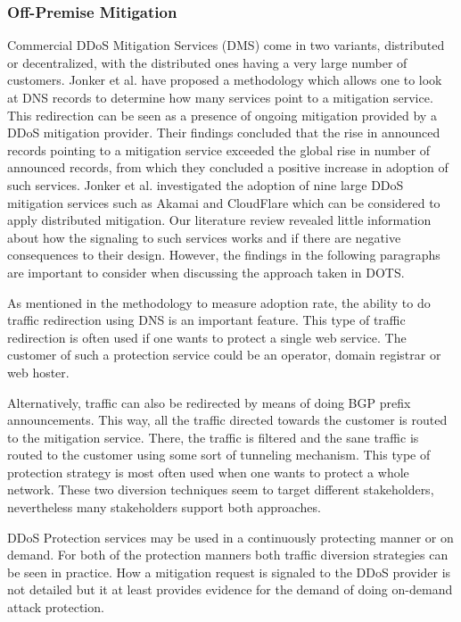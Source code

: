 \subsubsection{Off-Premise Mitigation}
Commercial DDoS Mitigation Services (DMS) come in two variants, distributed or decentralized, with the distributed ones having a very large number of customers. Jonker et al. have proposed a methodology which allows one to look at DNS records to determine how many services point to a mitigation service. This redirection can be seen as a presence of ongoing mitigation provided by a DDoS mitigation provider. Their findings concluded that the rise in announced records pointing to a mitigation service exceeded the global rise in number of announced records, from which they concluded a positive increase in adoption of such services.
Jonker et al. investigated the adoption of nine large DDoS mitigation services such as Akamai and CloudFlare which can be considered to apply distributed mitigation. Our literature review revealed little information about how the signaling to such services works and if there are negative consequences to their design. However, the findings in the following paragraphs are important to consider when discussing the approach taken in DOTS.

As mentioned in the methodology to measure adoption rate, the ability to do traffic redirection using DNS is an important feature. This type of traffic redirection is often used if one wants to protect a single web service. The customer of such a protection service could be an operator, domain registrar or web hoster.

Alternatively, traffic can also be redirected by means of doing BGP prefix announcements. This way, all the traffic directed towards the customer is routed to the mitigation service. There, the traffic is filtered and the sane traffic is routed to the customer using some sort of tunneling mechanism. This type of protection strategy is most often used when one wants to protect a whole network. These two diversion techniques seem to target different stakeholders, nevertheless many stakeholders support both approaches.

DDoS Protection services may be used in a continuously protecting manner or on demand. For both of the protection manners both traffic diversion strategies can be seen in practice. How a mitigation request is signaled to the DDoS provider is not detailed but it at least provides evidence for the demand of doing on-demand attack protection.

